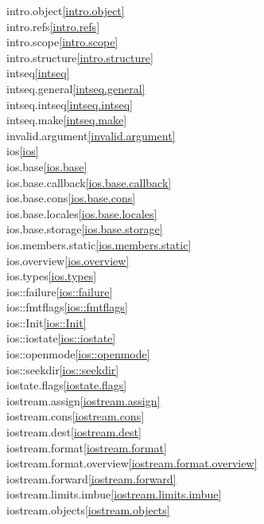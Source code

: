 \begin{multicols}{2}
intro.object\quad\ref{intro.object}\\
intro.refs\quad\ref{intro.refs}\\
intro.scope\quad\ref{intro.scope}\\
intro.structure\quad\ref{intro.structure}\\
intseq\quad\ref{intseq}\\
intseq.general\quad\ref{intseq.general}\\
intseq.intseq\quad\ref{intseq.intseq}\\
intseq.make\quad\ref{intseq.make}\\
invalid.argument\quad\ref{invalid.argument}\\
ios\quad\ref{ios}\\
ios.base\quad\ref{ios.base}\\
ios.base.callback\quad\ref{ios.base.callback}\\
ios.base.cons\quad\ref{ios.base.cons}\\
ios.base.locales\quad\ref{ios.base.locales}\\
ios.base.storage\quad\ref{ios.base.storage}\\
ios.members.static\quad\ref{ios.members.static}\\
ios.overview\quad\ref{ios.overview}\\
ios.types\quad\ref{ios.types}\\
ios::failure\quad\ref{ios::failure}\\
ios::fmtflags\quad\ref{ios::fmtflags}\\
ios::Init\quad\ref{ios::Init}\\
ios::iostate\quad\ref{ios::iostate}\\
ios::openmode\quad\ref{ios::openmode}\\
ios::seekdir\quad\ref{ios::seekdir}\\
iostate.flags\quad\ref{iostate.flags}\\
iostream.assign\quad\ref{iostream.assign}\\
iostream.cons\quad\ref{iostream.cons}\\
iostream.dest\quad\ref{iostream.dest}\\
iostream.format\quad\ref{iostream.format}\\
iostream.format.overview\quad\ref{iostream.format.overview}\\
iostream.forward\quad\ref{iostream.forward}\\
iostream.limits.imbue\quad\ref{iostream.limits.imbue}\\
iostream.objects\quad\ref{iostream.objects}\\

\end{multicols}
